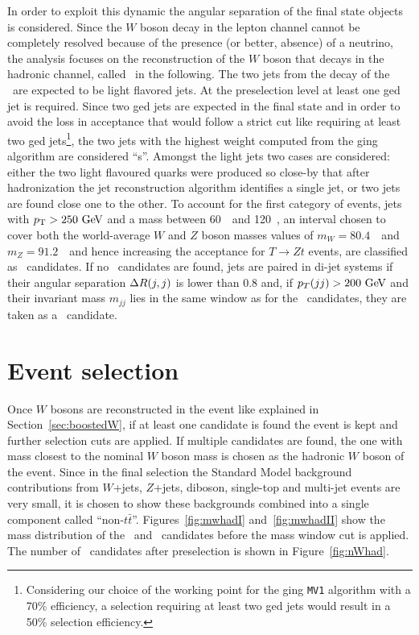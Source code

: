 In order to exploit this dynamic the angular separation of the final state
objects is considered. Since the $W$ boson decay
in the lepton channel cannot be completely resolved because of
the presence (or better, absence) of a neutrino, the analysis
focuses on the reconstruction of the $W$ boson that decays in the hadronic
channel, called \whad\ in the following.
The two jets from the decay of the \whad\ are expected to be
light flavored jets. At the preselection level at least
one \btag ged jet is required. Since two \btag ged jets are expected in
the final state and in order to avoid the loss in acceptance that would follow a strict
cut like requiring at least two \btag ged jets\footnote{Considering our choice
of the working point for the \btag ging \texttt{MV1} algorithm with a 70\%
efficiency, a selection requiring at least two \btag ged jets would result
in a 50\% selection efficiency.}, the two jets with the 
highest weight computed from the \btag ging algorithm are considered ``\bjet s''.
Amongst the light jets two cases are considered: either the two light flavoured
quarks were produced so close-by that after hadronization the jet reconstruction
algorithm identifies a single jet, or two jets are found close one to the other.
To account for the first category of events, jets with $\pt>250\gev$ and a mass
between 60~\gev\ and 120~\gev, an interval chosen to cover both the world-average 
$W$ and $Z$ boson masses values of $m_W = 80.4$~\gev\ and $m_Z = 91.2$~\gev\ and
hence increasing the acceptance for $T\to Zt$ events, are 
classified as \wi\ candidates. If no \wi\ candidates are found, jets are paired
in di-jet systems if their angular separation $\dr(j,j)$ is lower than 0.8 and, if
$p_T(jj)>200\gev$ and 
their invariant mass $m_{jj}$ lies in the same window as for the \wi\ candidates, they 
are taken as a \wii\ candidate.


\section{Event selection}\label{sec:wbxEVT}

Once $W$ bosons are reconstructed in the event like explained in 
Section~\ref{sec:boostedW}, if at least one candidate is found the 
event is kept and further selection cuts are applied.
If multiple candidates are found, the one with mass closest 
to the nominal $W$ boson mass is chosen as the hadronic $W$ boson
of the event. 
Since in the final selection the Standard Model background contributions
from $W$+jets, $Z$+jets, diboson, single-top and multi-jet events
are very small, it is chosen to show these backgrounds combined into a
single component called ``non-$t\bar{t}$''.
Figures~\ref{fig:mwhadI} and~\ref{fig:mwhadII} show the mass distribution
of the \wi\ and \wii\ candidates before the mass window cut is applied. The
number of \whad\ candidates after preselection is shown in
Figure~\ref{fig:nWhad}. 

